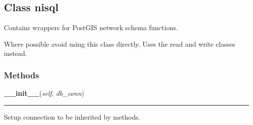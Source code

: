 
\subsection{Class nisql}

    \label{nx_pgnet:nisql}
Contains wrappers for PostGIS network schema functions.

Where possible avoid using this class directly. Uses the read and write 
classes instead.



  \subsubsection{Methods}

    \label{nx_pgnet:nisql:__init__}

    \vspace{0.5ex}

\hspace{.8\funcindent}\begin{boxedminipage}{\funcwidth}

    \raggedright \textbf{\_\_init\_\_}(\textit{self}, \textit{db\_conn})

    \vspace{-1.5ex}

    \rule{\textwidth}{0.5\fboxrule}
\setlength{\parskip}{2ex}
    Setup connection to be inherited by methods.

\setlength{\parskip}{1ex}
    \end{boxedminipage}

    \label{nx_pgnet:nisql:sql_function_check}

    \vspace{0.5ex}

